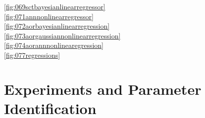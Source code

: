	  \ref{fig:069sctbayesianlinearregressor}\\

	  \ref{fig:071annnonlinearregressor}\\

	  \ref{fig:072aorbayesianlinearregression}\\

	  \ref{fig:073aorgaussiannonlinearregression}\\

	  \ref{fig:074aorannnonlinearegression}\\
  \ref{fig:077regressions}\\


\section{Experiments and Parameter Identification}
\label{sec:experimentsparameteridentification}




